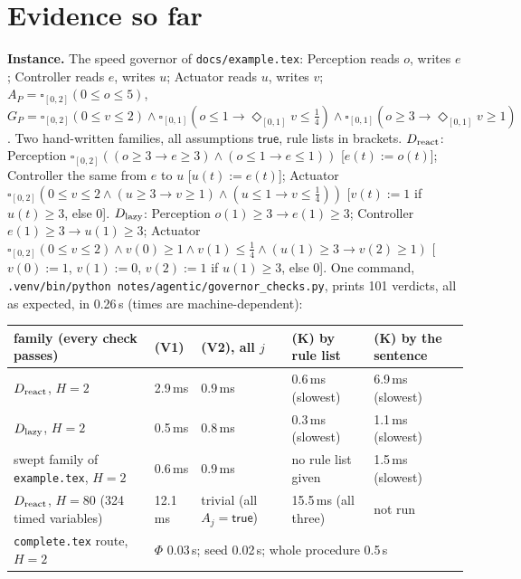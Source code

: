 \documentclass[10pt]{article}
\theoremstyle{tplain}\newtheorem{theorem}{Theorem}\newtheorem{lemma}[theorem]{Lemma}\newtheorem{proposition}[theorem]{Proposition}\newtheorem{corollary}[theorem]{Corollary}\newtheorem{claim}[theorem]{Claim}
\theoremstyle{tdef}\newtheorem{definition}[theorem]{Definition}
\newcommand{\TRUE}{\mathsf{true}}\newcommand{\FALSE}{\mathsf{false}}
\begin{document}
\section{Evidence so far}
\textbf{Instance.} The speed governor of \texttt{docs/example.tex}: Perception reads $o$, writes $e$; Controller reads $e$, writes $u$; Actuator reads $u$, writes $v$; $A_P=\square_{[0,2]}(0\le o\le5)$, $G_P=\square_{[0,2]}(0\le v\le2)\wedge\square_{[0,1]}(o\le1\to\Diamond_{[0,1]}v\le\frac14)\wedge\square_{[0,1]}(o\ge3\to\Diamond_{[0,1]}v\ge1)$. Two hand-written families, all assumptions $\TRUE$, rule lists in brackets. $D_{\rm react}$: Perception $\square_{[0,2]}((o\ge3\to e\ge3)\wedge(o\le1\to e\le1))$ [$e(t):=o(t)$]; Controller the same from $e$ to $u$ [$u(t):=e(t)$]; Actuator $\square_{[0,2]}(0\le v\le2\wedge(u\ge3\to v\ge1)\wedge(u\le1\to v\le\frac14))$ [$v(t):=1$ if $u(t)\ge3$, else $0$]. $D_{\rm lazy}$: Perception $o(1)\ge3\to e(1)\ge3$; Controller $e(1)\ge3\to u(1)\ge3$; Actuator $\square_{[0,2]}(0\le v\le2)\wedge v(0)\ge1\wedge v(1)\le\frac14\wedge(u(1)\ge3\to v(2)\ge1)$ [$v(0):=1$, $v(1):=0$, $v(2):=1$ if $u(1)\ge3$, else $0$]. One command, \texttt{.venv/bin/python notes/agentic/governor\_checks.py}, prints 101 verdicts, all as expected, in 0.26\,s (times are machine-dependent):\par\vspace{2pt}
{\renewcommand{\arraystretch}{1.1}
\begin{tabular}{@{}lllll@{}}
family (every check passes) & (V1) & (V2), all $j$ & (K) by rule list & (K) by the sentence\\\hline
$D_{\rm react}$, $H=2$ & 2.9\,ms & 0.9\,ms & 0.6\,ms (slowest) & 6.9\,ms (slowest)\\
$D_{\rm lazy}$, $H=2$ & 0.5\,ms & 0.8\,ms & 0.3\,ms (slowest) & 1.1\,ms (slowest)\\
swept family of \texttt{example.tex}, $H=2$ & 0.6\,ms & 0.9\,ms & no rule list given & 1.5\,ms (slowest)\\
$D_{\rm react}$, $H=80$ (324 timed variables) & 12.1\,ms & trivial (all $A_j=\TRUE$) & 15.5\,ms (all three) & not run\\\hline
\texttt{complete.tex} route, $H=2$ & \multicolumn{4}{l}{$\Phi$ 0.03\,s; seed 0.02\,s; whole procedure 0.5\,s}
\end{tabular}}\par\vspace{2pt}
\end{document}
